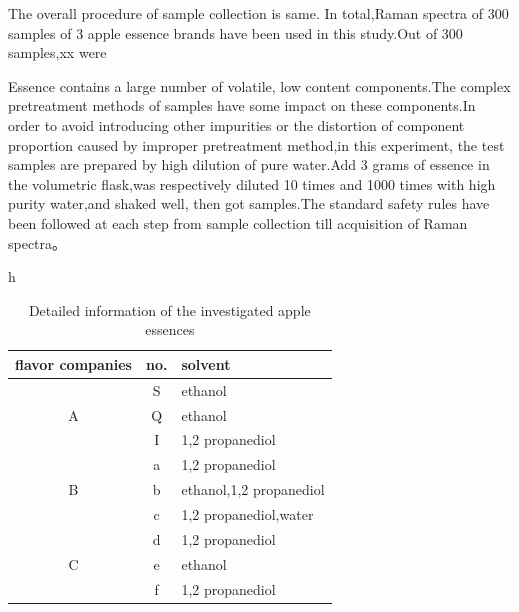 \documentclass[a4paper]{article}
\begin{document}
The overall procedure of sample collection is same. In total,Raman spectra of 300 samples of 3 apple essence brands have been used in this study.Out of 300 samples,xx were

Essence contains a large number of volatile, low content components.The complex pretreatment methods of samples have some impact on these components.In order to avoid introducing other impurities or the distortion of component proportion caused by improper pretreatment method,in this experiment, the test samples are prepared by high dilution of pure water.Add 3 grams of essence in the volumetric flask,was respectively diluted 10 times and 1000 times with high purity water,and  shaked well, then got samples.The  standard  safety  rules  have  been  followed  at  each step from sample collection till acquisition of Raman spectra。


\begin{table}{h} %
  \centering
  \caption{Detailed information of the investigated apple essences}\label{a}
  \begin{tabular}{c|c|l}

     \hline
     flavor companies       & no.       & solvent \\
     \hline
     \multirow{3}{*}{A}       & S         & ethanol \\
     \cline{2-3}
                              & Q         & ethanol \\
     \cline{2-3}
                              & I         & 1,2 propanediol \\
     \hline
     \multirow{3}{*}{B}       & a         & 1,2 propanediol \\
     \cline{2-3}
                              & b         & ethanol,1,2 propanediol \\
     \cline{2-3}
                              & c         & 1,2 propanediol,water \\
     \hline
     \multirow{3}{*}{C}       & d         & 1,2 propanediol \\
     \cline{2-3}
                              & e         & ethanol \\
     \cline{2-3}
                              & f         & 1,2 propanediol \\
     \hline
   \end{tabular}

\end{table}
\end{document}
